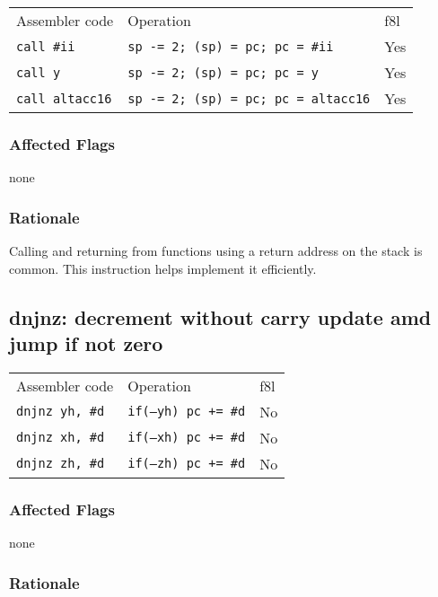 \documentclass{book}
\begin{document}
\begin{tabular}{l l l}
Assembler code         & Operation                                  & f8l \\
\texttt{call \#ii}     & \texttt{sp -= 2; (sp) = pc; pc = \#ii}     & Yes \\
\texttt{call y}        & \texttt{sp -= 2; (sp) = pc; pc = y}        & Yes \\
\texttt{call altacc16} & \texttt{sp -= 2; (sp) = pc; pc = altacc16} & Yes \\
\end{tabular}

\subsubsection*{Affected Flags}

none

\subsubsection*{Rationale}

Calling and returning from functions using a return address on the stack is common. This instruction helps implement it efficiently.


\subsection{dnjnz: decrement without carry update amd jump if not zero}

\begin{tabular}{l l l}
Assembler code         & Operation                   & f8l \\
\texttt{dnjnz yh, \#d} & \texttt{if(--yh) pc += \#d} & No \\
\texttt{dnjnz xh, \#d} & \texttt{if(--xh) pc += \#d} & No \\
\texttt{dnjnz zh, \#d} & \texttt{if(--zh) pc += \#d} & No \\
\end{tabular}

\subsubsection*{Affected Flags}

none

\subsubsection*{Rationale}
\end{document}
